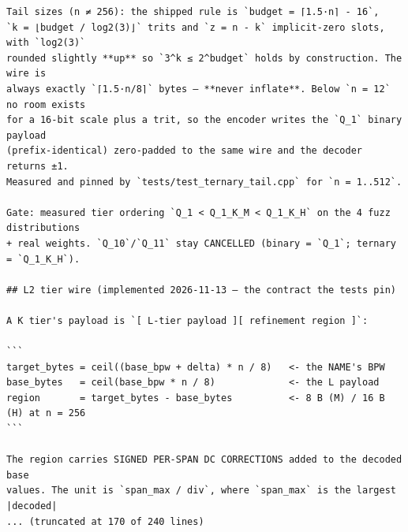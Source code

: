 \begin{verbatim}
Tail sizes (n ≠ 256): the shipped rule is `budget = ⌈1.5·n⌉ - 16`,
`k = ⌊budget / log2(3)⌋` trits and `z = n - k` implicit-zero slots, with `log2(3)`
rounded slightly **up** so `3^k ≤ 2^budget` holds by construction. The wire is
always exactly `⌈1.5·n/8⌉` bytes — **never inflate**. Below `n = 12` no room exists
for a 16-bit scale plus a trit, so the encoder writes the `Q_1` binary payload
(prefix-identical) zero-padded to the same wire and the decoder returns ±1.
Measured and pinned by `tests/test_ternary_tail.cpp` for `n = 1..512`.

Gate: measured tier ordering `Q_1 < Q_1_K_M < Q_1_K_H` on the 4 fuzz distributions
+ real weights. `Q_10`/`Q_11` stay CANCELLED (binary = `Q_1`; ternary = `Q_1_K_H`).

## L2 tier wire (implemented 2026-11-13 — the contract the tests pin)

A K tier's payload is `[ L-tier payload ][ refinement region ]`:

```
target_bytes = ceil((base_bpw + delta) * n / 8)   <- the NAME's BPW
base_bytes   = ceil(base_bpw * n / 8)             <- the L payload
region       = target_bytes - base_bytes          <- 8 B (M) / 16 B (H) at n = 256
```

The region carries SIGNED PER-SPAN DC CORRECTIONS added to the decoded base
values. The unit is `span_max / div`, where `span_max` is the largest |decoded|
... (truncated at 170 of 240 lines)
\end{verbatim}


